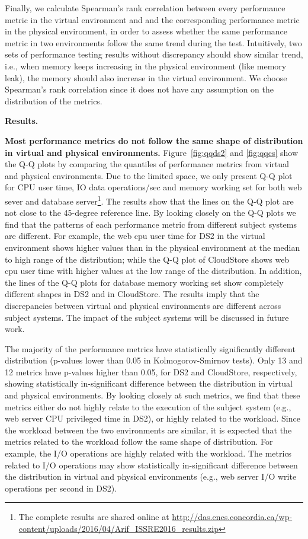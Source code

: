 Finally, we calculate Spearman's rank correlation between every performance metric in the virtual environment and and the corresponding performance metric in the physical environment, in order to assess whether the same performance metric in two environments follow the same trend during the test. Intuitively, two sets of performance testing results without discrepancy should show similar trend, i.e., when memory keeps increasing in the physical environment (like memory leak), the memory should also increase in the virtual environment. We choose Spearman's rank correlation since it does not have any assumption on the distribution of the metrics. 

\noindent \textbf{Results.}

\textbf{Most performance metrics do not follow the same shape of distribution in virtual and physical environments.} Figure~\ref{fig:qqds2} and \ref{fig:qqcs} show the Q-Q plots by comparing the quantiles of performance metrics from virtual and physical environments. Due to the limited space, we only present Q-Q plot for CPU user time, IO data operations/sec and memory working set for both web sever and database server\footnote{The complete results are shared online at \url{http://das.encs.concordia.ca/wp-content/uploads/2016/04/Arif_ISSRE2016_results.zip}}. The results show that the lines on the Q-Q plot are not close to the 45-degree reference line. By looking closely on the Q-Q plots we find that the patterns of each performance metric from different subject systems are different. For example, the web cpu user time for DS2 in the virtual environment shows higher values than in the physical environment at the median to high range of the distribution; while the Q-Q plot of CloudStore shows web cpu user time with higher values at the low range of the distribution. In addition, the lines of the Q-Q plots for database memory working set show completely different shapes in DS2 and in CloudStore. The results imply that the discrepancies between virtual and physical environments are different across subject systems. The impact of the subject systems will be discussed in future work.

The majority of the performance metrics have statistically significantly different distribution (p-values lower than 0.05 in Kolmogorov-Smirnov tests). Only 13 and 12 metrics have p-values higher than 0.05, for DS2 and CloudStore, respectively, showing statistically in-significant difference between the distribution in virtual and physical environments. By looking closely at such metrics, we find that these metrics either do not highly relate to the execution of the subject system (e.g., web server CPU privileged time in DS2), or highly related to the workload. Since the workload between the two environments are similar, it is expected that the metrics related to the workload follow the same shape of distribution. For example, the I/O operations are highly related with the workload. The metrics related to I/O operations may show statistically in-significant difference between the distribution in virtual and physical environments (e.g., web server I/O write operations per second in DS2). %

